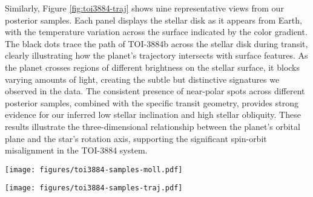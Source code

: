 \documentclass[twocolumn]{aastex631}
\begin{document}
Similarly, Figure \ref{fig:toi3884-traj} shows nine representative views from our posterior samples. Each panel displays the stellar disk as it 
appears from Earth, with the temperature variation across the surface indicated by the color gradient. The black dots trace 
the path of TOI-3884b across the stellar disk during transit, clearly illustrating how the planet's trajectory intersects 
with surface features. As the planet crosses regions of different brightness on the stellar surface, it blocks varying amounts 
of light, creating the subtle but distinctive signatures we observed in the data. The consistent presence of near-polar spots 
across different posterior samples, combined with the specific transit geometry, provides strong evidence for our inferred 
low stellar inclination and high stellar obliquity. These results illustrate the three-dimensional relationship 
between the planet's orbital plane and the star's rotation axis, supporting the significant spin-orbit misalignment in the 
TOI-3884 system.
%
\begin{figure*}[hbt!]
    \centering
    \texttt{[image: figures/toi3884-samples-moll.pdf]}
    \caption{Mollweide projections of the stellar surface of TOI-3884 showing spot distributions from nine representative 
    posterior samples. The majority of samples exhibit prominent high-latitude spot concentrations, with some variation in 
    the exact morphology and distribution. This consistent pattern of near-polar spots across different posterior samples 
    provides strong support for our inferred high-latitude magnetic activity. 
    These surface configurations produce the transit light curve modulations observed in Figure~\ref{fig:toi3884-transits}.}
    \label{fig:toi3884-moll}
\end{figure*}
%

%
\begin{figure*}[hbt!]
    \centering
    \texttt{[image: figures/toi3884-samples-traj.pdf]}
    \caption{Observer's view of TOI-3884 during transit events from nine representative posterior samples. 
    Each panel shows the stellar disk as viewed from Earth, with dark purple regions indicating cooler spots and 
    yellow-orange areas representing the warmer photosphere. Black dots trace the path of TOI-3884b across the stellar disk 
    during transit. The consistent presence of high-latitude spots intersecting or near the planet's trajectory explains the 
    asymmetries observed in the transit light curves. This visualization demonstrates how the combination of stellar inclination 
    ($i_\star = {34.8}^{+5.62}_{-6.17}$ degrees), spot distribution, and planetary orbital geometry produces the distinctive
    transit signatures in the TESS data.}
    \label{fig:toi3884-traj}
\end{figure*}
%
\end{document}
